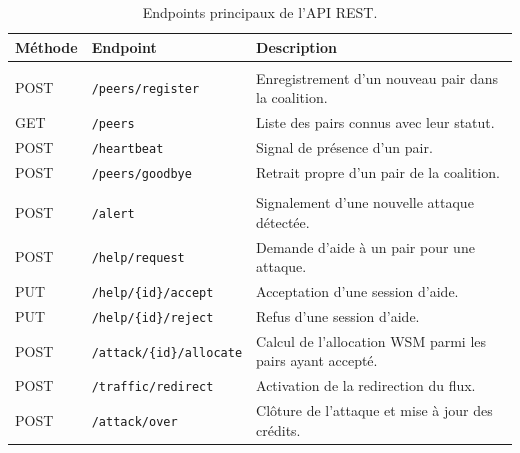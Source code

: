 \begin{table}[H]
\centering
\caption{Endpoints principaux de l'API REST.}
\label{tab:api}

\renewcommand{\arraystretch}{1.5}
\setlength{\tabcolsep}{5pt}

\begin{tabular}{|
>{\raggedright\arraybackslash}p{2.0cm}|
>{\raggedright\arraybackslash}p{6.0cm}|
>{\raggedright\arraybackslash}p{7.0cm}|}
\hline

\textbf{Méthode} &
\textbf{Endpoint} &
\textbf{Description} \\
\hline

\multicolumn{3}{|l|}{\textit{Découverte et membership}} \\
\hline

POST &
\texttt{/peers/register} &
Enregistrement d'un nouveau pair dans la coalition. \\
\hline

GET &
\texttt{/peers} &
Liste des pairs connus avec leur statut. \\
\hline

POST &
\texttt{/heartbeat} &
Signal de présence d'un pair. \\
\hline

POST &
\texttt{/peers/goodbye} &
Retrait propre d'un pair de la coalition. \\
\hline

\multicolumn{3}{|l|}{\textit{Mitigation collaborative}} \\
\hline

POST &
\texttt{/alert} &
Signalement d'une nouvelle attaque détectée. \\
\hline

POST &
\texttt{/help/request} &
Demande d'aide à un pair pour une attaque. \\
\hline

PUT &
\texttt{/help/\{id\}/accept} &
Acceptation d'une session d'aide. \\
\hline

PUT &
\texttt{/help/\{id\}/reject} &
Refus d'une session d'aide. \\
\hline

POST &
\texttt{/attack/\{id\}/allocate} &
Calcul de l'allocation WSM parmi les pairs ayant accepté. \\
\hline

POST &
\texttt{/traffic/redirect} &
Activation de la redirection du flux. \\
\hline

POST &
\texttt{/attack/over} &
Clôture de l'attaque et mise à jour des crédits. \\
\hline


\end{tabular}
\end{table}
